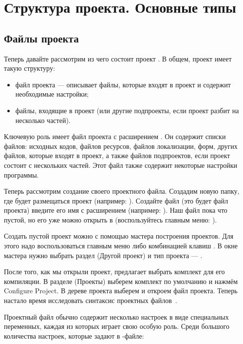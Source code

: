 \chapter[Структура проекта. Основные типы]{\bfseries Структура проекта. Основные типы}
\section[Файлы проекта]{Файлы проекта}
Теперь давайте рассмотрим из чего состоит проект . В общем, проект 
имеет такую структуру:

\begin{itemize}
\item {}файл проекта --- описывает файлы,
которые входят в проект и содержит необходимые настройки;
\item файлы, входящие в проект (или другие подпроекты, если проект разбит на несколько частей).
\end{itemize}
Ключевую роль имеет файл проекта с расширением .
Он содержит списки файлов: исходных кодов, файлов ресурсов, файлов локализации, форм, других файлов,
которые входят в проект, а также файлов подпроектов, если
проект состоит с нескольких частей. Этот файл также содержит некоторые настройки программы.

Теперь рассмотрим создание своего проектного файла. Создадим новую папку, 
где будет размещаться проект (например: ). Создайте файл (это будет файл 
проекта) введите его имя с расширением  (например:
). Наш файл пока что пустой, но его уже можно открыть в  
(воспользуйтесь главным меню: ). 

Создать пустой проект можно с
помощью  мастера построения проектов. Для этого надо воспользоваться главным меню 
 либо комбинацией клавиш . В 
окне мастера нужно выбрать раздел  (Другой проект) и тип 
проекта --- .

После того, как мы открыли проект,  предлагает выбрать комплект
для его компиляции. В разделе  (Проекты) выберем
комплект по умолчанию и нажмём Configure
Project. В дереве проекта выберем  и откроем файл проекта. Теперь настало время
исследовать синтаксис проектных файлов~.

Проектный файл обычно содержит несколько настроек в виде специальных переменных, каждая из которых играет
свою особую роль. Среди большого количества настроек, которые задают в -файле:

